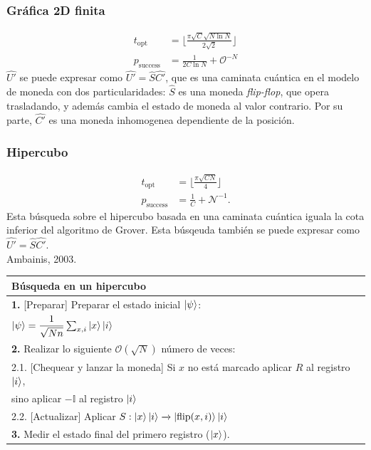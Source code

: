 \subsubsection*{Gráfica 2D finita}
\begin{align}
    t_{\text{opt}}&=\lfloor\frac{\pi \sqrt{C}\sqrt{N\ln N}}{2\sqrt{2}}\rfloor\\
    p_{\text{success}}&=\frac{1}{2C\ln N}+\mathcal{O}^{-N}
\end{align}
$\hat{U'}$ se puede expresar como $\hat{U'}=\hat{S}\hat{C'}$, que es una caminata cuántica en el modelo de moneda con dos particularidades: $\hat{S}$ es una moneda \textit{flip-flop}, que opera trasladando, y además cambia el estado de moneda al valor contrario. Por su parte, $\hat{C'}$ es una moneda inhomogenea dependiente de la posición.
\subsubsection*{Hipercubo}
\begin{align}
    t_{\text{opt}}&=\lfloor\frac{\pi \sqrt{CN}}{4}\rfloor\\
    p_{\text{success}}&=\frac{1}{C}+\mathcal{N^{-1}}.
\end{align}
Esta búsqueda sobre el hipercubo basada en una caminata cuántica iguala la cota inferior del algoritmo de Grover.
Esta búsqeuda también se puede expresar como $\hat{U'}=\hat{S}\hat{C'}$.\\
\cite{shenvi2003quantum} \cite{ambainis2003quantum} Ambainis, 2003.
\begin{center}
    \begin{tabular}{l}
    \hline \textbf{Búsqueda en un hipercubo} \\\hline 
    \textbf{1.} [Preparar] Preparar el estado inicial $\ket{\psi}$:\\ $\ket{\psi}=\dfrac{1}{\sqrt{Nn}}\sum_{x,i}\ket{x}\ket{i}$\\
    \textbf{2.} Realizar lo siguiente $\mathcal{O}(\sqrt{N})$ número de veces:\\
    2.1. [Chequear y lanzar la moneda] Si $x$ no está marcado aplicar $R$ al registro $\ket{i}$,\\
    sino aplicar $-\mathbb{I}$ al registro $\ket{i}$\\
    2.2. [Actualizar] Aplicar $S:\ket{x}\ket{i}\xrightarrow{}\ket{\text{flip}(x,i)}\ket{i}$\\
    \textbf{3.} Medir el estado final del primero registro ($\ket{x}$).\\\hline
    \end{tabular}{}
\end{center}{}



